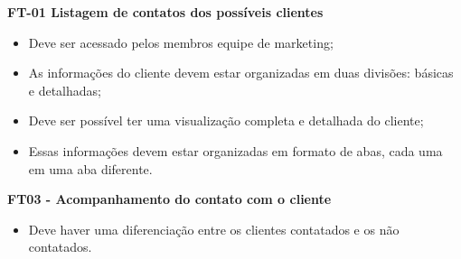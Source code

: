       \textbf{FT-01 Listagem de contatos dos possíveis clientes}
      \begin{itemize}
       \item Deve ser acessado pelos membros equipe de marketing;
       \item As informações do cliente devem estar organizadas em duas divisões: básicas e detalhadas;
       \item Deve ser possível ter uma visualização completa e detalhada do cliente;
       \item Essas informações devem estar organizadas em formato de abas, cada uma em uma aba diferente.
      \end{itemize}
      
      \textbf{FT03 - Acompanhamento do contato com o cliente}
      \begin{itemize}
       \item Deve haver uma diferenciação entre os clientes contatados e os não contatados.
      \end{itemize}


